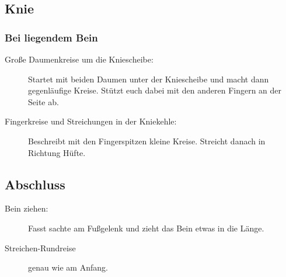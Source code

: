 \subsection{Knie}

\subsubsection{Bei liegendem Bein}

\begin{description}
  \item [Große Daumenkreise um die Kniescheibe:] Startet mit beiden Daumen unter der Kniescheibe und macht dann gegenläufige Kreise. Stützt euch dabei mit den anderen Fingern an der Seite ab.
  \item [Fingerkreise und Streichungen in der Kniekehle:] Beschreibt mit den Fingerspitzen kleine Kreise. Streicht danach in Richtung Hüfte.
\end{description}


\subsection{Abschluss}

\begin{description}
  \item [Bein ziehen:] Fasst sachte am Fußgelenk und zieht das Bein etwas in die Länge.
  \item [Streichen-Rundreise] genau wie am Anfang.
\end{description}
